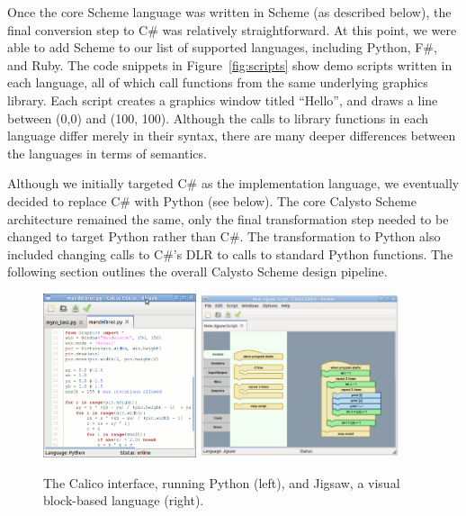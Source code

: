 \documentclass[acmsmall,screen,authorversion]{acmart}
\begin{document}
Once the core Scheme language was written in Scheme (as described below), the
final conversion step to C\# was relatively straightforward. At this point, we
were able to add Scheme to our list of supported languages, including Python,
F\#, and Ruby.  The code snippets in Figure~\ref{fig:scripts} show demo scripts
written in each language, all of which call functions from the same underlying
graphics library. Each script creates a graphics window titled ``Hello'', and
draws a line between (0,0) and (100, 100). Although the calls to library
functions in each language differ merely in their syntax, there are many deeper
differences between the languages in terms of semantics.

Although we initially targeted C\# as the implementation language, we
eventually decided to replace C\# with Python (see below). The core Calysto
Scheme architecture remained the same, only the final transformation step
needed to be changed to target Python rather than C\#. The transformation to
Python also included changing calls to C\#'s DLR to calls to standard Python
functions. The following section outlines the overall Calysto Scheme design
pipeline.


\begin{figure}
  \centering
  \includegraphics[width=0.40\textwidth]{calico-interface-python.jpg}
  \hspace{0.15in}
  \includegraphics[width=0.523\textwidth]{calico-interface-jigsaw.jpg}
  \caption{The Calico interface, running Python (left),
    and Jigsaw, a visual block-based language (right).}
  \label{fig:calico}
\end{figure}
\end{document}
